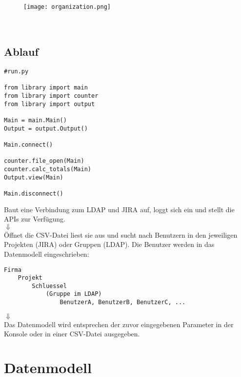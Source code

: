 \documentclass[a4paper,12pt]{report}
\begin{document}
	\begin{figure}[h]
		\texttt{[image: organization.png]}\\\\\\
	\end{figure}	

	\section{Ablauf}
	\begin{lstlisting}
#run.py	

from library import main
from library import counter
from library import output

Main = main.Main()
Output = output.Output()

Main.connect()

counter.file_open(Main)
counter.calc_totals(Main)
Output.view(Main)

Main.disconnect()
	\end{lstlisting}
	\vspace{10mm}
	\begin{center}
		Baut eine Verbindung zum LDAP und JIRA auf, loggt sich ein und stellt die APIs zur Verfügung.
		\linebreak\\$\Downarrow$\linebreak\\
		Öffnet die CSV-Datei liest sie aus und sucht nach Benutzern in den jeweiligen Projekten (JIRA) oder Gruppen (LDAP).
		Die Benutzer werden in das Datenmodell eingeschrieben:
		\begin{lstlisting}
Firma
	Projekt
		Schluessel
			(Gruppe im LDAP)
				BenutzerA, BenutzerB, BenutzerC, ...
		\end{lstlisting}
		$\Downarrow$\linebreak\\
		Das Datenmodell wird entsprechen der zuvor eingegebenen Parameter in der Konsole oder in einer CSV-Datei ausgegeben.\\
	\end{center}
	
\chapter{Datenmodell}
\end{document}
